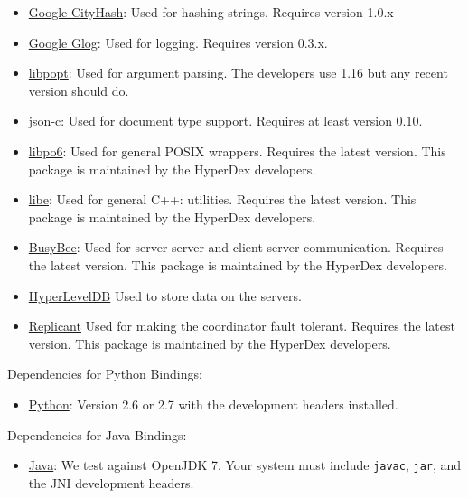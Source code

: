 \begin{itemize}
\item \href{http://code.google.com/p/cityhash/}{Google CityHash}:  Used for
    hashing strings.  Requires version 1.0.x
\item \href{http://code.google.com/p/google-glog/}{Google Glog}:  Used for
    logging.  Requires version 0.3.x.
\item \href{http://rpm5.org/}{libpopt}: Used for argument parsing.  The
    developers use 1.16 but any recent version should do.
\item \href{https://github.com/json-c/json-c}{json-c}:  Used for document type
    support.  Requires at least version 0.10.
\item \href{http://hyperdex.org/downloads/}{libpo6}: Used for general POSIX
    wrappers.  Requires the latest version.  This package is maintained by the
    HyperDex developers.
\item \href{http://hyperdex.org/downloads/}{libe}: Used for general C++:
    utilities.  Requires the latest version.  This package is maintained by the
    HyperDex developers.
\item \href{http://hyperdex.org/downloads/}{BusyBee}: Used for server-server
    and client-server communication.  Requires the latest version.  This package
    is maintained by the HyperDex developers.
\item \href{http://hyperdex.org/downloads/}{HyperLevelDB}  Used to store data
    on the servers.
\item \href{http://hyperdex.org/downloads/}{Replicant} Used for making the
    coordinator fault tolerant.  Requires the latest version.  This package is
    maintained by the HyperDex developers.
\end{itemize}

Dependencies for Python Bindings:

\begin{itemize}
\item \href{http://python.org/}{Python}: Version 2.6 or 2.7 with the
    development headers installed.
\end{itemize}

Dependencies for Java Bindings:

\begin{itemize}
\item \href{http://openjdk.java.net/}{Java}: We test against OpenJDK 7.  Your
    system must include \texttt{javac}, \texttt{jar}, and the JNI development
    headers.
\end{itemize}

